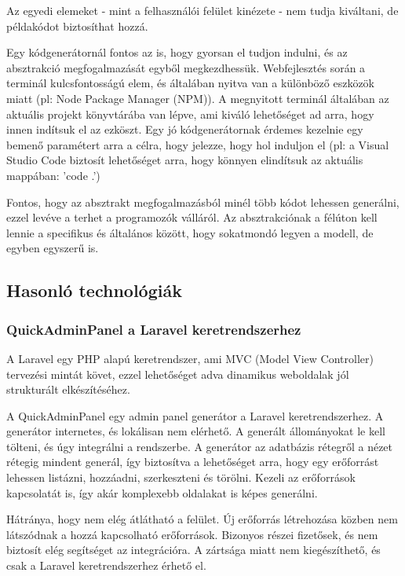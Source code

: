 \documentclass[a4paper,12pt,oneside]{report}
\begin{document}
\begin{justify}
	Az egyedi elemeket - mint a felhasználói felület kinézete - nem tudja kiváltani, de példakódot biztosíthat hozzá.

	Egy kódgenerátornál fontos az is, hogy gyorsan el tudjon indulni, és az absztrakció megfogalmazását egyből megkezdhessük. Webfejlesztés során a terminál kulcsfontosságú elem, és általában nyitva van a különböző eszközök miatt (pl: Node Package Manager (NPM)). A megnyitott terminál általában az aktuális projekt könyvtárába van lépve, ami kiváló lehetőséget ad arra, hogy innen indítsuk el az ezköszt. Egy jó kódgenerátornak érdemes kezelnie egy bemenő paramétert arra a célra, hogy jelezze, hogy hol induljon el (pl: a Visual Studio Code biztosít lehetőséget arra, hogy könnyen elindítsuk az aktuális mappában: 'code .') 

	Fontos, hogy az absztrakt megfogalmazásból minél több kódot lehessen generálni, ezzel levéve a terhet a programozók válláról. Az absztrakciónak a félúton kell lennie a specifikus és általános között, hogy sokatmondó legyen a modell, de egyben egyszerű is.


\end{justify}

\newpage
\subsection{Hasonló technológiák}
\subsubsection{QuickAdminPanel a Laravel keretrendszerhez}

\begin{justify}

	A Laravel egy PHP alapú keretrendszer, ami MVC (Model View Controller) tervezési mintát követ, ezzel lehetőséget adva dinamikus weboldalak jól strukturált elkészítéséhez. 

	A QuickAdminPanel egy admin panel generátor a Laravel keretrendszerhez. A generátor internetes, és lokálisan nem elérhető. A generált állományokat le kell tölteni, és úgy integrálni a rendszerbe. A generátor az adatbázis rétegről a nézet rétegig mindent generál, így biztosítva a lehetőséget arra, hogy egy erőforrást lehessen listázni, hozzáadni, szerkeszteni és törölni. Kezeli az erőforrások kapcsolatát is, így akár komplexebb oldalakat is képes generálni.

	Hátránya, hogy nem elég átlátható a felület. Új erőforrás létrehozása közben nem látszódnak a hozzá kapcsolható erőforrások. Bizonyos részei fizetősek, és nem biztosít elég segítséget az integrációra. A zártsága miatt nem kiegészíthető, és csak a Laravel keretrendszerhez érhető el.

\end{justify}
\end{document}
